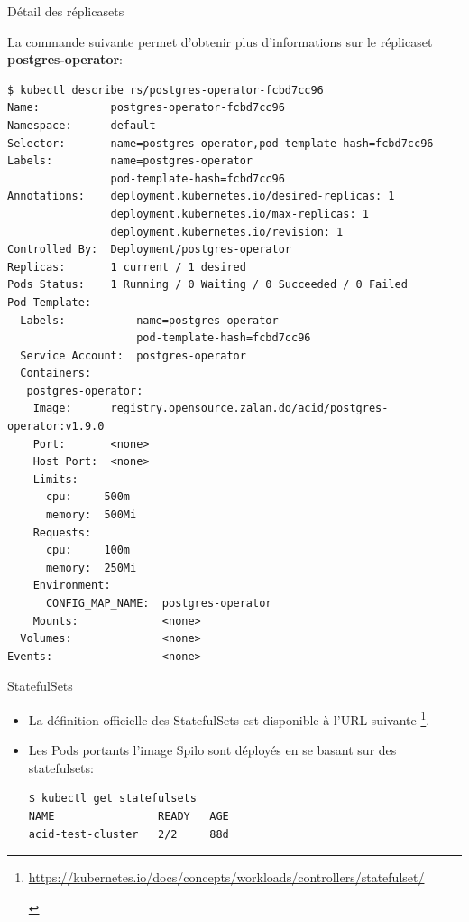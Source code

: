 
\begin{frame}[fragile,shrink=7]{Détail des réplicasets}

La commande suivante permet d'obtenir plus d'informations sur le réplicaset \textbf{postgres-operator}:
\begin{tiny}
\begin{Verbatim}[commandchars=\&\#\#]
$ kubectl describe rs/postgres-operator-fcbd7cc96
Name:           postgres-operator-fcbd7cc96
Namespace:      default
Selector:       name=postgres-operator,pod-template-hash=fcbd7cc96
Labels:         name=postgres-operator
                pod-template-hash=fcbd7cc96
Annotations:    deployment.kubernetes.io/desired-replicas: 1
                deployment.kubernetes.io/max-replicas: 1
                deployment.kubernetes.io/revision: 1
Controlled By:  Deployment/postgres-operator
Replicas:       1 current / 1 desired
Pods Status:    1 Running / 0 Waiting / 0 Succeeded / 0 Failed
Pod Template:
  Labels:           name=postgres-operator
                    pod-template-hash=fcbd7cc96
  Service Account:  postgres-operator
  Containers:
   postgres-operator:
    Image:      registry.opensource.zalan.do/acid/postgres-operator:v1.9.0
    Port:       <none>
    Host Port:  <none>
    Limits:
      cpu:     500m
      memory:  500Mi
    Requests:
      cpu:     100m
      memory:  250Mi
    Environment:
      CONFIG_MAP_NAME:  postgres-operator
    Mounts:             <none>
  Volumes:              <none>
Events:                 <none>
\end{Verbatim}
\end{tiny}

\end{frame}


\begin{frame}[fragile]{StatefulSets}

   \begin{itemize}
      \item La définition officielle des StatefulSets est disponible à l'URL suivante \footnote{
      \begin{tcolorbox}
   \url{https://kubernetes.io/docs/concepts/workloads/controllers/statefulset/}
      \end{tcolorbox}
}.
   \item Les Pods portants l'image Spilo sont déployés en se basant sur des statefulsets:
\begin{tiny}
\begin{Verbatim}[commandchars=\&\#\#]
$ kubectl get statefulsets
NAME                READY   AGE
acid-test-cluster   2/2     88d
\end{Verbatim}
\end{tiny}
   \end{itemize}

\end{frame}

